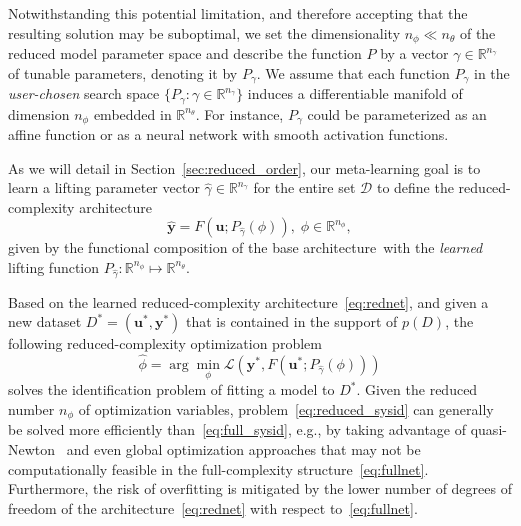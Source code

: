 \documentclass{article}
\newcommand{\base}{{base architecture}}
\newcommand{\seq}[1]{{\mathbf{#1}}}
\newcommand{\R}{\mathbb{R}}
\newcommand{\DD}{\mathcal{D}}
\newcommand{\loss}{\mathcal{L}}
\newcommand{\fullpar}{\theta}
\newcommand{\redpar}{\phi}
\newcommand{\projpar}{\gamma}
\newcommand{\M}{F}
\begin{document}
Notwithstanding this potential limitation, and therefore accepting that the resulting solution may be suboptimal, we set the dimensionality $n_\redpar \ll n_\fullpar$ of the reduced model parameter space
and describe the function $P$ by a vector $\projpar \in \R^{n_\projpar}$ of tunable parameters, denoting it by $P_\projpar$.
We assume that each function $P_\projpar$ in the \emph{user-chosen} search space $\{P_\projpar : \projpar \in \R^{n_\projpar}\}$ induces a differentiable manifold of dimension $n_\redpar$ embedded in $\R^{n_\fullpar}$.
For instance, $P_\projpar$ could be parameterized as an affine function or as a neural network with smooth activation functions.

As we will detail in Section~\ref{sec:reduced_order}, our meta-learning goal is to learn a lifting parameter vector $\hat \projpar \in \R^{n_\projpar}$ for the entire set $\DD$ to define the reduced-complexity architecture
\begin{equation}
\label{eq:rednet}
\hat {\seq{y}} = \M(\seq{u}; P_{\hat \projpar}(\redpar)),\;  \redpar \in  \R^{n_\redpar},
\end{equation}
given by the functional composition of the \base\ with  the \emph{learned} lifting function
$P_{\hat \projpar} : \R^{n_\redpar} \mapsto \R^{n_\fullpar}$.

Based on the learned reduced-complexity architecture~\eqref{eq:rednet}, and given a new dataset $D^* = (\seq{u}^*, \seq{y}^*)$ that is contained in the support of $p(D)$, the following reduced-complexity optimization problem
\begin{equation}
    \label{eq:reduced_sysid}
    \hat \redpar = \arg \min_{\redpar} \loss(\seq y^*, \M(\seq u^*; P_{\hat\projpar}(\redpar)))
\end{equation}
solves the identification problem of fitting a model to $D^*$.
Given the reduced number $n_\redpar$ of optimization variables, problem~\eqref{eq:reduced_sysid} can generally be solved more efficiently than~\eqref{eq:full_sysid}, e.g., by taking advantage of quasi-Newton~\cite{Bem25,Bem23} and even global optimization approaches that may not be computationally feasible in the full-complexity structure~\eqref{eq:fullnet}.
Furthermore, the risk of overfitting is mitigated by the lower number of degrees of freedom of the architecture~\eqref{eq:rednet} with respect to~\eqref{eq:fullnet}.
\end{document}
